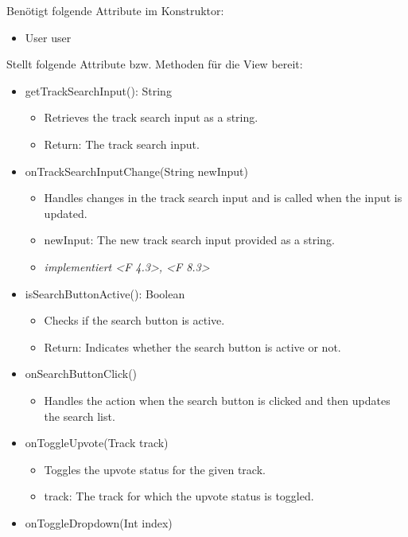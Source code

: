 \documentclass[oneside, ngerman]{sdqtechreport}
\begin{document}
Benötigt folgende Attribute im Konstruktor:
\begin{itemize}
    \item User user
\end{itemize}
Stellt folgende Attribute bzw. Methoden für die View bereit:
\begin{itemize}

    \item getTrackSearchInput(): String
        \begin{itemize}
            \item Retrieves the track search input as a string.
            \item Return: The track search input.
        \end{itemize}
    \item onTrackSearchInputChange(String newInput)
        \begin{itemize}
            \item Handles changes in the track search input and is called when the input is updated.
            \item newInput: The new track search input provided as a string.
            \item \textit{implementiert <F 4.3>, <F 8.3>}
        \end{itemize}
    \item isSearchButtonActive(): Boolean
        \begin{itemize}
            \item Checks if the search button is active.
            \item Return: Indicates whether the search button is active or not.
        \end{itemize}
    \item onSearchButtonClick()
        \begin{itemize}
            \item Handles the action when the search button is clicked and then updates the search list.
        \end{itemize}
    \item onToggleUpvote(Track track)
        \begin{itemize}
            \item Toggles the upvote status for the given track.
            \item track: The track for which the upvote status is toggled.
        \end{itemize}
    \item onToggleDropdown(Int index)

\end{itemize}
\end{document}
